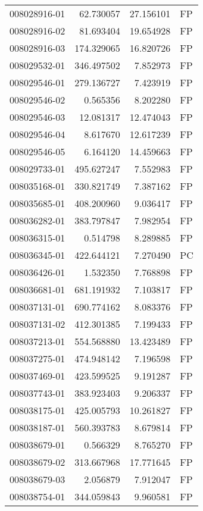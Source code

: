 \begin{tabular}{lrrl}
008028916-01 &   62.730057 &    27.156101 &   FP \\
008028916-02 &   81.693404 &    19.654928 &   FP \\
008028916-03 &  174.329065 &    16.820726 &   FP \\
008029532-01 &  346.497502 &     7.852973 &   FP \\
008029546-01 &  279.136727 &     7.423919 &   FP \\
008029546-02 &    0.565356 &     8.202280 &   FP \\
008029546-03 &   12.081317 &    12.474043 &   FP \\
008029546-04 &    8.617670 &    12.617239 &   FP \\
008029546-05 &    6.164120 &    14.459663 &   FP \\
008029733-01 &  495.627247 &     7.552983 &   FP \\
008035168-01 &  330.821749 &     7.387162 &   FP \\
008035685-01 &  408.200960 &     9.036417 &   FP \\
008036282-01 &  383.797847 &     7.982954 &   FP \\
008036315-01 &    0.514798 &     8.289885 &   FP \\
008036345-01 &  422.644121 &     7.270490 &   PC \\
008036426-01 &    1.532350 &     7.768898 &   FP \\
008036681-01 &  681.191932 &     7.103817 &   FP \\
008037131-01 &  690.774162 &     8.083376 &   FP \\
008037131-02 &  412.301385 &     7.199433 &   FP \\
008037213-01 &  554.568880 &    13.423489 &   FP \\
008037275-01 &  474.948142 &     7.196598 &   FP \\
008037469-01 &  423.599525 &     9.191287 &   FP \\
008037743-01 &  383.923403 &     9.206337 &   FP \\
008038175-01 &  425.005793 &    10.261827 &   FP \\
008038187-01 &  560.393783 &     8.679814 &   FP \\
008038679-01 &    0.566329 &     8.765270 &   FP \\
008038679-02 &  313.667968 &    17.771645 &   FP \\
008038679-03 &    2.056879 &     7.912047 &   FP \\
008038754-01 &  344.059843 &     9.960581 &   FP \\

\end{tabular}
